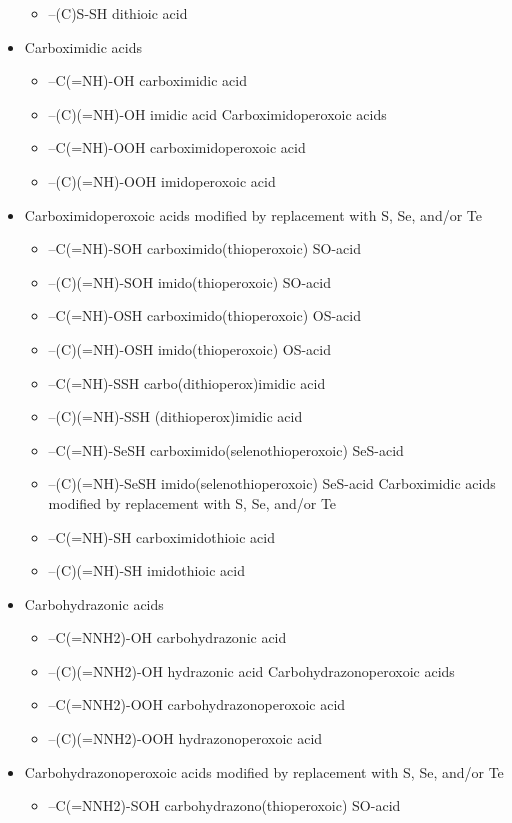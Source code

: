\documentclass[a4paper,12pt]{report}
\begin{document}
\begin{itemize}
\begin{itemize}
\item –(C)S-SH dithioic acid 
\end{itemize}
\item Carboximidic acids 
\begin{itemize}
\item –C(=NH)-OH carboximidic acid 
\item –(C)(=NH)-OH imidic acid Carboximidoperoxoic acids 
\item –C(=NH)-OOH carboximidoperoxoic acid 
\item –(C)(=NH)-OOH imidoperoxoic acid \end{itemize}
\item Carboximidoperoxoic acids modified by replacement with S, Se, and/or Te 
\begin{itemize}
\item –C(=NH)-SOH carboximido(thioperoxoic) SO-acid 
\item –(C)(=NH)-SOH imido(thioperoxoic) SO-acid 
\item –C(=NH)-OSH carboximido(thioperoxoic) OS-acid 
\item –(C)(=NH)-OSH imido(thioperoxoic) OS-acid 
\item –C(=NH)-SSH carbo(dithioperox)imidic acid 
\item –(C)(=NH)-SSH (dithioperox)imidic acid 
\item –C(=NH)-SeSH carboximido(selenothioperoxoic) SeS-acid 
\item –(C)(=NH)-SeSH imido(selenothioperoxoic) SeS-acid Carboximidic acids modified by replacement with S, Se, and/or Te 
\item –C(=NH)-SH carboximidothioic acid 
\item –(C)(=NH)-SH imidothioic acid 
\end{itemize}
\item Carbohydrazonic acids 
\begin{itemize}
\item –C(=NNH2)-OH carbohydrazonic acid 
\item –(C)(=NNH2)-OH hydrazonic acid Carbohydrazonoperoxoic acids 
\item –C(=NNH2)-OOH carbohydrazonoperoxoic acid 
\item –(C)(=NNH2)-OOH hydrazonoperoxoic acid 
\end{itemize}
\item Carbohydrazonoperoxoic acids modified by replacement with S, Se, and/or Te 
\begin{itemize}
\item –C(=NNH2)-SOH carbohydrazono(thioperoxoic) SO-acid 

\end{itemize}
\end{itemize}
\end{document}
